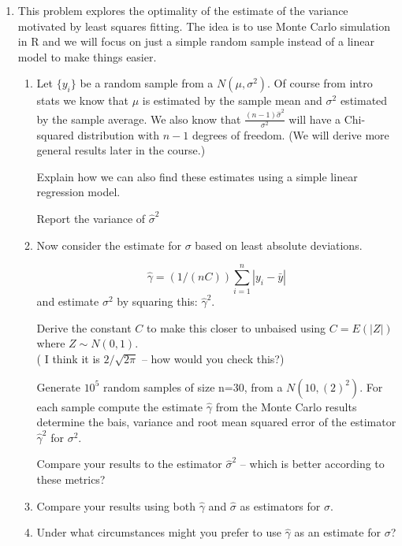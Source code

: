 \documentclass[11pt]{report}
\begin{document}
\begin{enumerate}
\item This problem explores the optimality of the estimate of the variance motivated by least squares fitting. 
The idea is to use Monte Carlo simulation in R and we will focus on just a simple random sample instead of a linear model to make things easier. 

\begin{enumerate}
\item  Let   $\{ y_i \}$ be a random sample from a $N(\mu, \sigma^2)$. Of course from intro stats we know that $\mu$ is estimated by the sample mean and $\sigma^2$ estimated by the sample average.  We also know that 
$\frac{(n-1) \hat{\sigma}^2}{\sigma^2}$ will have a  Chi-squared distribution with $n-1$ degrees of freedom. (We will derive more general results later in the course.)  

\bdot Explain how we can also find these estimates  using a simple linear regression model. 

\bdot  Report the variance of  $\hat{\sigma}^2$ 

\item Now consider the estimate for $\sigma$ based on least absolute deviations. 

\[  \hat{\gamma} =  (1/(nC)) \sum_{i=1} ^n | y_i -  \bar{y} |  \]
and estimate $\sigma^2$ by  squaring this: $\hat{\gamma}^2$.

\bdot Derive the constant  $C$ to make this closer to unbaised  using   $C= E( |Z|)$ where  $Z \sim N(0,1) $. \\ 
( I think it is $2/\sqrt{2 \pi }$ -- how would you check this?)

\bdot Generate $10^5$ random samples of size n=30, from  a $N(10, (2)^2) $.  For each sample compute the estimate 
$\hat{\gamma}$  from the Monte Carlo results  determine the bais, variance  and root mean squared error of the estimator $\hat{\gamma}^2$ for $\sigma^2$. 

\bdot Compare your results to the estimator $\hat{\sigma}^2$ -- which is better according to these metrics?

\item Compare your results  using both  $\hat{\gamma}$  and  $ \hat{\sigma}$ as estimators for $\sigma$. 

\item Under what circumstances might you prefer to use $\hat{\gamma}$  as an estimate for $\sigma$?




\end{enumerate}


 
\end{enumerate}
%
\end{document}
